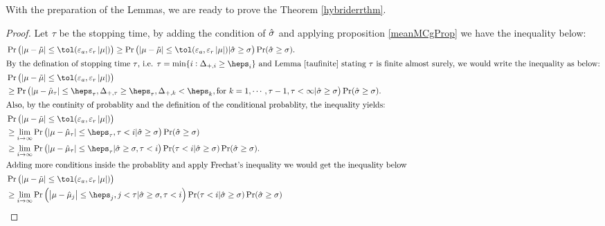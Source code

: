 \documentclass{iitthesis}
\newtheorem{lemma}[theorem]{Lemma}
\begin{document}
With the preparation of the Lemmas, we are ready to prove the Theorem \ref{hybriderrthm}.
\begin{proof}
Let $\tau$ be the stopping time, by adding the condition of $\hat{\sigma}$ and applying proposition \ref{meanMCgProp} we have the inequality below:
\begin{align*}
&\Pr\left (\abs{\mu-\tmu} \leq \tol(\varepsilon_a, \varepsilon_r \abs{\mu})\right) \geq\Pr\left(\abs{\mu-\tmu} \leq \tol(\varepsilon_a, \varepsilon_r \abs{\mu})|\hsigma\geq \sigma\right) \Pr(\hsigma\geq \sigma).\\
\intertext{By the defination of stopping time $\tau$, i.e. $\tau = \min\{ i: \Delta_{+,i} \geq \heps_i \}$ and Lemma \ref{taufinite} stating $\tau$ is finite almost surely, we would write the inequality as below:}
&\Pr\left (\abs{\mu-\tmu} \leq \tol(\varepsilon_a, \varepsilon_r \abs{\mu})\right)\\ &\geq \Pr\left(\abs{\mu-\hmu_\tau}\leq \heps_\tau,  \Delta_{+,\tau} \geq \heps_{\tau}, \Delta_{+,k} < \heps_{k}, \text{for } k = 1,\cdots,\tau-1, \tau<\infty|\hsigma\geq \sigma\right)\Pr(\hsigma\geq \sigma).\\
\intertext{Also, by the continity of probablity and the definition of the conditional probablity, the inequality yields: }
&\Pr\left (\abs{\mu-\tmu} \leq \tol(\varepsilon_a, \varepsilon_r \abs{\mu})\right) \\
& \geq \lim_{i\to \infty} \Pr\left(\abs{\mu-\hmu_\tau}\leq \heps_\tau, \tau<i|\hsigma\geq \sigma\right)\Pr(\hsigma\geq \sigma)\\
& \geq \lim_{i\to \infty}\Pr\left(\abs{\mu-\hmu_\tau}\leq \heps_\tau | \hsigma \geq \sigma, \tau <i\right)\Pr(\tau<i|\hsigma\geq\sigma)\Pr(\hsigma\geq \sigma).\\
\intertext{Adding more conditions inside the probablity and apply Frechat's inequality we would get the inequality below}
&\Pr\left (\abs{\mu-\tmu} \leq \tol(\varepsilon_a, \varepsilon_r \abs{\mu})\right) \\
&\geq\lim_{i\to \infty} \Pr\left(\abs{\mu-\hmu_j}\leq \heps_j, j< \tau|\hsigma \geq \sigma ,\tau < i\right)\Pr(\tau< i|\hsigma \geq \sigma)\Pr(\hsigma\geq \sigma)\\

\end{align*}
\end{proof}
\end{document}

